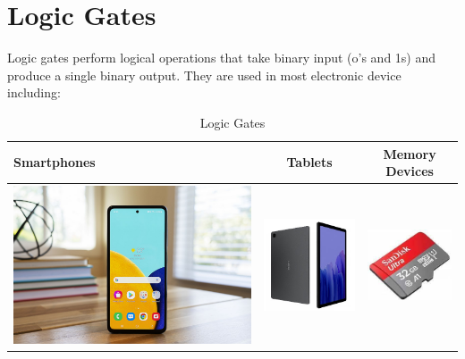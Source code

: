 \documentclass{article}
\begin{document}
	\section{Logic Gates}
	Logic gates perform logical operations that take binary input (o's and 1s) and produce a single binary output. They are used in most electronic device including:
	\begin{table}[h!]
		\begin{center}
			\caption{Logic Gates}
			\label{tab:table1}
			\begin{tabular}{|l|c|c|}
				\hline
				Smartphones
				&
				Tablets
				&
				Memory Devices
				\\
				\hline
				\includegraphics[width=0.2\linewidth]{Picture2}
				&
				\includegraphics[width=0.25\linewidth]{Picture3}
				&
				\includegraphics[width=0.2\linewidth]{Picture4}
				\\
				\hline
				\end{tabular}
		\end{center}
		\end{table}
	\newpage
\end{document}
